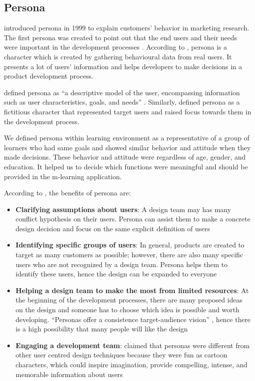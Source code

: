 \documentclass[a4paper,twoside]{article}
\begin{document}

\subsection {Persona}

\noindent\citet{cooper1999inmates} introduced persona in 1999 to explain customers' behavior in marketing research. The first persona was created to point out that the end users and their needs were important in the development processes \citep{idoughi2012adding}. According to \citet{cooper1999inmates}, persona is a character which is created by gathering behavioural data from real users. It presents a lot of users' information and helps developers to make decisions in a product development process. 

\citet{idoughi2012adding} defined persona as ``a descriptive model of the user, encompassing information such as user characteristics, goals, and needs'' \citep[p.288]{idoughi2012adding}. Similarly, \citet{pruitt2010persona} defined persona as a fictitious character that represented target users and raised focus towards them in the development process. 

We defined persona within learning environment as a representative of a group of learners who had same goals and showed similar behavior and attitude when they made decisions. These behavior and attitude were regardless of age, gender, and education. It helped us to decide which functions were meaningful and should be provided in the m-learning application. 

According to \citet{pruitt2010persona}, the benefits of persona are: 
\begin {itemize}
\item \textbf{Clarifying assumptions about users}: A design team may has many conflict hypothesis on their users. Persona can assist them to make a concrete design decision and focus on the same explicit definition of users 
\item \textbf{Identifying specific groups of users}: In general, products are created to target as many customers as possible; however, there are also many specific users who are not recognized by a design team. Persona helps them to identify these users, hence the design can be expanded to everyone 
\item \textbf{Helping a design team to make the most from limited resources}: At the beginning of the development processes, there are many proposed ideas on the design and someone has to choose which idea is possible and worth developing. ``Personas offer a consistence target-audience vision'' \citep[p.18]{pruitt2010persona}, hence there is a high possibility that many people will like the design
\item \textbf{Engaging a development team}: \citet{pruitt2010persona} claimed that personas were different from other user centred design techniques because they were fun as cartoon characters, which could inspire imagination, provide compelling, intense, and memorable information about users
\end{itemize}
\end{document}

